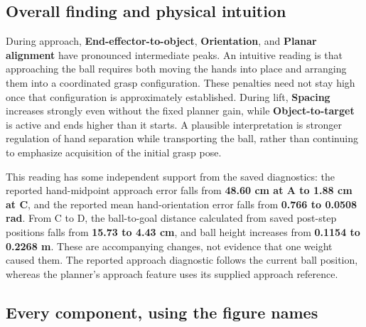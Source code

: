 \documentclass[11pt,a4paper]{article}
\begin{document}
\subsection{Overall finding and physical intuition}

During approach, \textbf{End-effector-to-object}, \textbf{Orientation}, and \textbf{Planar alignment} have pronounced intermediate peaks. An intuitive reading is that approaching the ball requires both moving the hands into place and arranging them into a coordinated grasp configuration. These penalties need not stay high once that configuration is approximately established. During lift, \textbf{Spacing} increases strongly even without the fixed planner gain, while \textbf{Object-to-target} is active and ends higher than it starts. A plausible interpretation is stronger regulation of hand separation while transporting the ball, rather than continuing to emphasize acquisition of the initial grasp pose.

This reading has some independent support from the saved diagnostics: the reported hand-midpoint approach error falls from \textbf{48.60 cm at A to 1.88 cm at C}, and the reported mean hand-orientation error falls from \textbf{0.766 to 0.0508 rad}. From C to D, the ball-to-goal distance calculated from saved post-step positions falls from \textbf{15.73 to 4.43 cm}, and ball height increases from \textbf{0.1154 to 0.2268 m}. These are accompanying changes, not evidence that one weight caused them. The reported approach diagnostic follows the current ball position, whereas the planner's approach feature uses its supplied approach reference.

\subsection{Every component, using the figure names}
\end{document}
